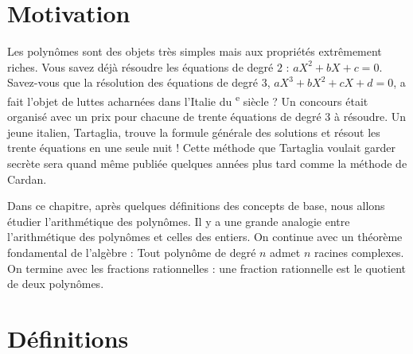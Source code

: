 \documentclass[class=report,crop=false]{standalone}
\begin{document}









\section*{Motivation}



Les polynômes sont des objets très simples mais aux propriétés extrêmement riches.
Vous savez déjà résoudre les équations de degré $2$ : $aX^2+bX+c=0$.
Savez-vous que la résolution des équations de degré $3$,
$aX^3+bX^2+cX+d=0$, a fait l'objet de luttes acharnées dans l'Italie
du \textsc{}\textsuperscript{e} siècle ?
Un concours était organisé avec un prix pour chacune de trente équations
de degré $3$ à résoudre. Un jeune italien, Tartaglia, trouve la formule générale des solutions
et résout les trente équations en une seule nuit ! Cette méthode que Tartaglia voulait garder secrète
sera quand même publiée quelques années plus tard comme la \og méthode de Cardan\fg.

Dans ce chapitre, après quelques définitions des concepts de base,
nous allons étudier l'arithmétique des polynômes. Il y a une grande analogie
entre l'arithmétique des polynômes et celles des entiers.
On continue avec un théorème fondamental de l'algèbre :
\og Tout polynôme de degré $n$ admet $n$ racines complexes. \fg{}
On termine avec les fractions rationnelles : une fraction rationnelle
est le quotient de deux polynômes.

\medskip



\section{Définitions}
\end{document}
